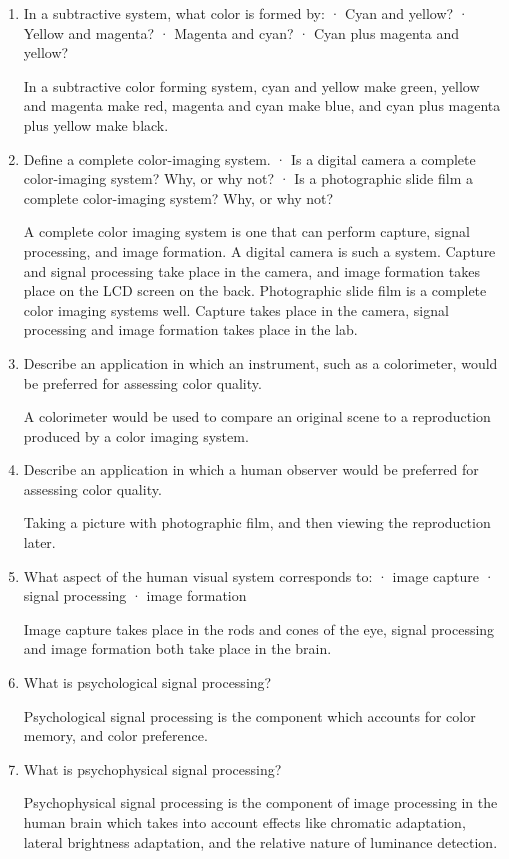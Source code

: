 \begin{enumerate}
 \item
 In a subtractive system, what color is formed by: · Cyan and yellow? · Yellow and magenta? · Magenta and cyan? · Cyan plus magenta and yellow?
 \par In a subtractive color forming system, cyan and yellow make green, yellow and magenta make red, magenta and cyan make blue, and cyan plus magenta plus yellow make black.
 \item
 Define a complete color-imaging system. · Is a digital camera a complete color-imaging system? Why, or why not? · Is a photographic slide film a complete color-imaging system? Why, or why not?
 \par A complete color imaging system is one that can perform capture, signal processing, and image formation.  A digital camera is such a system.  Capture and signal processing take place in the camera, and image formation takes place on the LCD screen on the back.  Photographic slide film is a complete color imaging systems well.  Capture takes place in the camera, signal processing and image formation takes place in the lab.
 \item
 Describe an application in which an instrument, such as a colorimeter, would be preferred for assessing color quality.
 \par A colorimeter would be used to compare an original scene to a reproduction produced by a color imaging system.
 \item
 Describe an application in which a human observer would be preferred for assessing color quality.
 \par Taking a picture with photographic film, and then viewing the reproduction later.
 \item
 What aspect of the human visual system corresponds to: · image capture · signal processing · image formation
 \par Image capture takes place in the rods and cones of the eye, signal processing and image formation both take place in the brain.
 \item
 What is psychological signal processing?
 \par Psychological signal processing is the component which accounts for color memory, and color preference.
 \item
 What is psychophysical signal processing?
 \par Psychophysical signal processing is the component of image processing in the human brain which takes into account effects like chromatic adaptation, lateral brightness adaptation, and the relative nature of luminance detection.

\end{enumerate}

